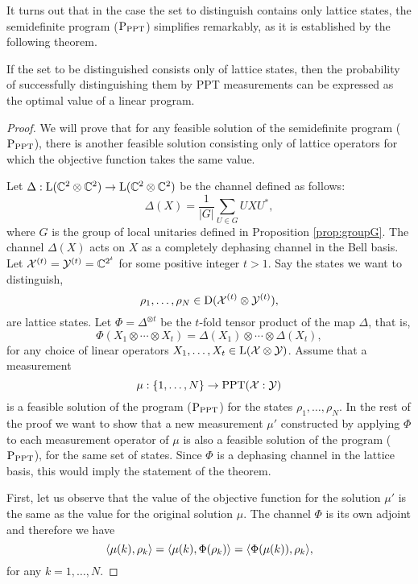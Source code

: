 It turns out that in the case the set to distinguish contains only lattice states,
the semidefinite program ($\textup{P}_{\mathrm{PPT}}$) simplifies remarkably, as it is established 
by the following theorem.
\begin{theorem}
If the set to be distinguished consists only of lattice states, then the probability of 
successfully distinguishing them by PPT measurements can be expressed as the 
optimal value of a linear program.
\end{theorem}
\begin{proof}
We will prove that for any feasible solution of the semidefinite program ($\textup{P}_{\mathrm{PPT}}$), 
there is another feasible solution consisting only of lattice operators 
for which the objective function takes the same value.

Let $\Delta : \mathrm{L}(\mathbb{C}^{2}\otimes\mathbb{C}^{2}) \rightarrow 
  \mathrm{L}(\mathbb{C}^{2}\otimes\mathbb{C}^{2})$ be the channel defined as follows:
\begin{equation}
  \Delta(X) = \frac{1}{|G|}\sum_{U \in G} UXU^{*},
\end{equation}
where $G$ is the group of local unitaries defined in Proposition \ref{prop:groupG}. 
The channel $\Delta(X)$ acts on $X$ as a completely dephasing channel in the Bell basis.
Let $\mathcal{X}^{(t)} = \mathcal{Y}^{(t)} = \mathbb{C}^{2^{t}}$ for some positive integer $t > 1$. 
Say the states we want to distinguish,
\begin{equation}
  \rho_{1}, \ldots, \rho_{N} \in \mathrm{D}(\mathcal{X}^{(t)}\otimes\mathcal{Y}^{(t)}),
\end{equation}
are lattice states.
Let $\Phi = \Delta^{\otimes t}$ be the $t$-fold tensor product of the map $\Delta$,
that is,
\begin{equation}
  \Phi(X_{1}\otimes\cdots\otimes X_{t}) = 
    \Delta(X_{1})\otimes\cdots\otimes\Delta(X_{t}),
\end{equation}
for any choice of linear operators $X_{1}, \ldots, X_{t} \in \mathrm{L}(\mathcal{X}\otimes\mathcal{Y})$. 
Assume that a measurement 
\[
  \mu : \{1,\ldots,N\}\to\mathrm{PPT}(\mathcal{X}:\mathcal{Y})
\] 
is a feasible solution of the program ($\textup{P}_{\mathrm{PPT}}$) 
for the states $\rho_{1}, \ldots, \rho_{N}$. 
In the rest of the proof we want to show that a new measurement $\mu'$ constructed by 
applying $\Phi$ to each measurement operator of $\mu$ is also a feasible solution
of the program ($\textup{P}_{\mathrm{PPT}}$), for the same set of states.
Since $\Phi$ is a dephasing channel in the lattice basis, this would imply the 
statement of the theorem. 

First, let us observe that the value of the objective function for the solution 
$\mu'$ is the same as the value for the original solution $\mu$.
The channel $\Phi$ is its own adjoint and therefore we have
\[
  \langle \mu(k) , \rho_{k}\rangle = \langle \mu(k) , \Phi(\rho_{k})\rangle = 
  \langle \Phi(\mu(k)) , \rho_{k}\rangle ,
\]
for any $k = 1, \ldots, N$.


\end{proof}
